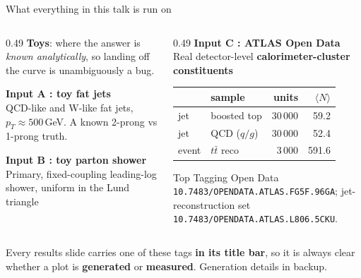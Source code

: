 \documentclass[aspectratio=169,10pt]{beamer}
\newcommand{\smallnote}[1]{{\footnotesize\color{fjgray} #1}}
\newcommand{\inputtag}[2]{{\footnotesize\textbf{\textcolor{#1}{#2}}}}
\newcommand{\toyAbody}{\inputtag{fjblue}{Input A : toy fat jets}}
\newcommand{\toyBbody}{\inputtag{fjblue}{Input B : toy parton shower}}
\newcommand{\realCbody}{\inputtag{fjgreen}{Input C : ATLAS Open Data}}
\begin{document}
\begin{frame}{What everything in this talk is run on}
\begin{columns}[T]
\begin{column}{0.49\textwidth}
\textbf{Toys}: where the answer is \emph{known analytically}, so landing off
the curve is unambiguously a bug.
\smallskip

\toyAbody\\
{\small QCD-like and W-like fat jets, $p_T\!\approx\!500$\,GeV. A known 2-prong
vs 1-prong truth.}
\smallskip

\toyBbody\\
{\small Primary, fixed-coupling leading-log shower, uniform in the Lund
triangle}
\end{column}
\begin{column}{0.49\textwidth}
\realCbody\\
{\small Real detector-level \textbf{calorimeter-cluster constituents} }
\smallskip

{\footnotesize
\begin{tabular}{@{}llrr@{}}
\toprule
& sample & units & $\langle N\rangle$\\
\midrule
\textcolor{regjet}{jet} & boosted top & 30\,000 & 59.2\\
\textcolor{regjet}{jet} & QCD ($q/g$) & 30\,000 & 52.4\\
\textcolor{regevt}{event} & $t\bar t$ reco & 3\,000 & 591.6\\
\bottomrule
\end{tabular}}
\smallskip

\smallnote{Top Tagging Open Data \texttt{10.7483/OPENDATA.ATLAS.FG5F.96GA};
jet-reconstruction set \texttt{10.7483/OPENDATA.ATLAS.L806.5CKU}.}
\end{column}
\end{columns}
\vspace{0.4em}
\begin{block}{}
\small Every results slide carries one of these tags \textbf{in its title bar},
so it is always clear whether a plot is \textbf{generated} or \textbf{measured}.
\smallnote{Generation details in backup.}
\end{block}
\end{frame}
\end{document}
